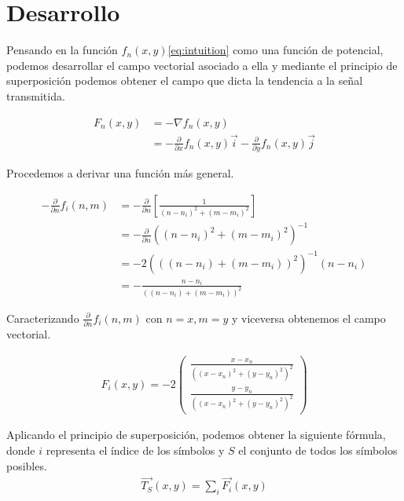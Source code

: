 \documentclass{article}
\newcommand{\partder}[1]{\frac{\partial}{\partial #1}}
\begin{document}
\section{Desarrollo}
Pensando en la función $f_n(x,y)$\ref{eq:intuition} como una función de
potencial, podemos desarrollar el campo vectorial asociado a ella y
mediante el principio de superposición podemos obtener el campo que
dicta la tendencia a la señal transmitida.

\begin{align}
  \label{eq:development}
  F_n\left( x, y \right) &= -\nabla f_n\left( x, y \right)\\
  &= - \partder{x} f_n \left( x, y \right) \vec{i} - \partder{y} f_n \left( x, y \right) \vec{j}
\end{align}

Procedemos a derivar una función más general.

\begin{align}
  \label{eq:derivative}
  - \partder{n} f_i \left( n, m \right) &= - \partder{n} \left[ \frac{1}{\left( n - n_i \right)^2 + \left( m - m_i \right)^2 } \right]\\
  &= - \partder{n} \left( \left( n - n_i \right)^2 + \left( m - m_i \right)^2 \right)^{-1}\\
  &= - 2\left( \left( \left( n - n_i \right) + \left( m - m_i \right) \right)^2 \right)^{-1} \left( n - n_i \right)\\
  &= - \frac{n - n_i}{\left( \left( n - n_i \right) + \left( m - m_i \right) \right)^2}
\end{align}

Caracterizando $\partder{n}f_i\left( n, m \right)$ con $n = x, m = y$ y viceversa
obtenemos el campo vectorial.

\begin{align}
  \label{eq:development2}
  F_i(x,y) = - 2 \left(
  \begin{array}{c}
    \frac{x - x_n}{\left( \left( x - x_n \right)^2 + \left( y - y_n \right)^2\right)^2}\\
    \frac{y - y_n}{\left( \left( x - x_n \right)^2 + \left( y - y_n \right)^2\right)^2}
  \end{array}
  \right)
\end{align}

Aplicando el principio de superposición, podemos obtener la siguiente fórmula,
donde $i$ representa el índice de los símbolos y $S$ el conjunto de todos los
símbolos posibles.
\begin{align}
  \label{eq:superposition}
  \vec{T_S}(x,y) = \sum\limits_{i} \vec{F_i}\left( x, y\right)
\end{align}
\end{document}
